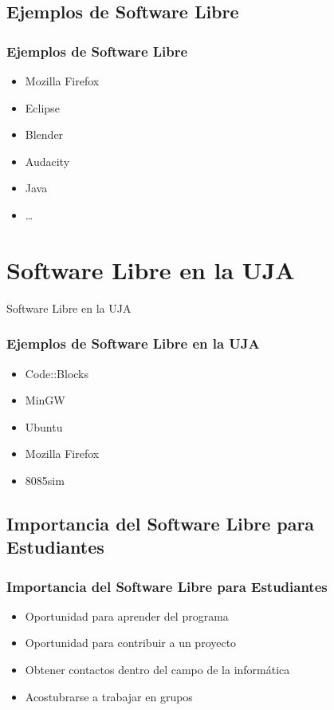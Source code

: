 \documentclass[xetex]{beamer}
\begin{document}

\subsection{Ejemplos de Software Libre}
\begin{frame}
    \frametitle{Ejemplos de Software Libre}
    \pause{}
    \begin{itemize}[<+->]
        \item Mozilla Firefox
        \item Eclipse
        \item Blender
        \item Audacity
        \item Java
        \item \ldots
    \end{itemize}
\end{frame}


\section{Software Libre en la UJA}
\begin{frame}
    \centering \Huge Software Libre en la UJA
\end{frame}


\begin{frame}
    \frametitle{Ejemplos de Software Libre en la UJA}
    \pause{}
    \begin{itemize}[<+->]
        \item Code::Blocks
        \item MinGW
        \item Ubuntu
        \item Mozilla Firefox
        \item 8085sim
    \end{itemize}
\end{frame}


\subsection{Importancia del Software Libre para Estudiantes}
\begin{frame}[t]
    \frametitle{Importancia del Software Libre para Estudiantes}
    \pause{}
    \begin{itemize}[<+->]
        \item Oportunidad para aprender del programa
        \item Oportunidad para contribuir a un proyecto
        \item Obtener contactos dentro del campo de la informática
        \item Acostubrarse a trabajar en grupos
    \end{itemize}
\end{frame}
\end{document}
